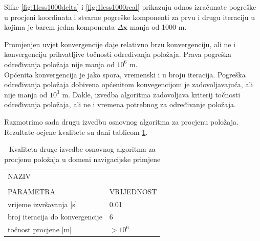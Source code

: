 \documentclass[a4paper,twoside,12pt]{memoir} %
\begin{document}
Slike \ref{fig:1less1000delta} i \ref{fig:1less1000real} prikazuju odnos izračunate pogreške u procjeni koordinata i stvarne pogreške komponenti za prvu i drugu iteraciju u kojima je barem jedna komponenta $\Delta \mathbf{x}$
manja od 1000 m.

Promjenjen uvjet konvergencije daje relativno brzu konvergenciju, ali ne i konvergenciju 
prihvatljive točnosti određivanja položaja.
Prava pogreška određivanja položaja nije manja od $10^6$ m.\\


Općenita konvergencija je jako spora, vremenski i u broju iteracija.
Pogreška određivanja položaja dobivena općenitom konvegencijom je zadovoljavajuća, ali nije manja od $10^3$ m.
Dakle, izvedba algoritma zadovoljava kriterij točnosti određivanja položaja, ali ne i 
vremena potrebnog za određivanje položaja. 
\vspace{0.5cm}

Razmotrimo sada drugu izvedbu osnovnog algoritma za procjenu položaja. 
Rezultate ocjene kvalitete su dani tablicom \ref{table:osnovni2izvedba}.
\begin{table}[H]
	\caption{Kvaliteta druge izvedbe osnovnog algoritma za procjenu položaja u domeni navigacijske primjene}
	\begin{center}
		\begin{tabular}{|p{3cm}|p{4cm}|}
			\hline
			\rowcolor{lightgray}NAZIV&   \\
			\rowcolor{lightgray}&   \\
			\multirow{-3}{1cm}{ \cellcolor{lightgray}PARAMETRA} & \multirow{-3}{2cm}{\cellcolor{lightgray}VRIJEDNOST} \\
			\hline
			\vspace{0.1cm}
			vrijeme izvršavanja [s] & \vspace{0.1cm}  0.01\\
			\vspace{0.1cm}
			broj iteracija do konvergencije & \vspace{0.1cm} $6$ \\
			\vspace{0.1cm}
			točnost procjene [m] & \vspace{0.1cm} $ > 10^6$ \\
			\hline
		\end{tabular}
	\end{center}
	\label{table:osnovni2izvedba}
\end{table}
\end{document}
